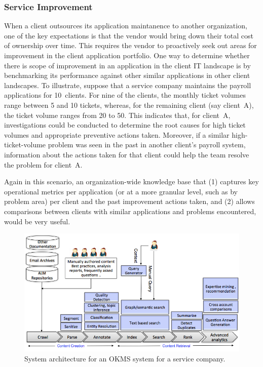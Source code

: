 \subsubsection{Service Improvement}

When a client outsources its application maintanence to another organization,
one of the key expectations is that the vendor would bring down their total cost
of ownership over time. This requires the vendor to proactively seek out areas
for improvement in the client application portfolio. One way to determine
whether there is scope of improvement in an application in the client IT
landscape is by benchmarking its performance against other similar applications
in other client landscapes. To illustrate, suppose that a service company
maintains the payroll applications for 10~clients. For nine of the clients, the
monthly ticket volumes range between 5 and 10 tickets, whereas, for the
remaining client (say client~A), the ticket volume ranges from 20 to 50. This
indicates that, for client~A, investigations could be conducted to determine the
root causes for high ticket volumes and appropriate preventive actions
taken. Moreover, if a similar high-ticket-volume problem was seen in the past in
another client's payroll system, information about the actions taken for that
client could help the team resolve the problem for client~A.

Again in this scenario, an organization-wide knowledge base that (1) captures key
operational metrics per application (or at a more granular level, such as by
problem area) per client and the past improvement actions taken, and (2) allows
comparisons between clients with similar applications and problems encountered,
would be very useful.

\begin{figure}
	\center
	\includegraphics[scale=0.45]{figs/km.png}
        \vspace*{-10pt}
	\caption{System architecture for an OKMS system for a service company.}
        \vspace*{-10pt}
	\label{fig-km}
\end{figure}


